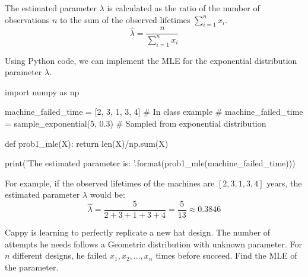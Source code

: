 \documentclass[a4paper, 10pt]{article}
\begin{document}
\begin{solution}
The estimated parameter \( \lambda \) is calculated as the ratio of the number of observations \( n \) to the sum of the observed lifetimes \( \sum_{i=1}^{n} x_i \).
\[
    \hat{\lambda} = \frac{n}{\sum_{i=1}^{n} x_i}
\]

Using Python code, we can implement the MLE for the exponential distribution parameter \( \lambda \).
\begin{codingbox}
import numpy as np

machine_failed_time = [2, 3, 1, 3, 4]   # In class example
# machine_failed_time = sample_exponential(5, 0.3)  # Sampled from exponential distribution

def prob1_mle(X):
  return len(X)/np.sum(X)

print('The estimated parameter is: {}'.format(prob1_mle(machine_failed_time)))
\end{codingbox}

For example, if the observed lifetimes of the machines are \( [2, 3, 1, 3, 4] \) years, the estimated parameter \( \lambda \) would be:
\[
    \hat{\lambda} = \frac{5}{2 + 3 + 1 + 3 + 4} = \frac{5}{13} \approx 0.3846
\]
\end{solution}

\newpage

\begin{problem}
Cappy is learning to perfectly replicate a new hat design.
The number of attempts he needs follows a Geometric distribution with unknown parameter.
For \( n \) different designs, he failed \( x_1, x_2, ..., x_n \) times before succeed.
Find the MLE of the parameter.
\end{problem}
\end{document}
